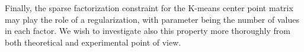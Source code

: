 Finally, the sparse factorization constraint for the K-means center point matrix may play the role of a regularization, with parameter being the number of values in each factor. 
We wish to investigate also this property more thoroughly from both theoretical and experimental point of view.

